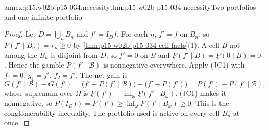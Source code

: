 \begin{annexitem}{annex:p15.w02b-p15-034.necessity}{thm:p15-w02b-p15-034-necessity}{Two portfolios and one infinite portfolio}
\begin{proof}
Let \(D=\bigcup_nB_n\) and \(f'=I_Df\). For each \(n\), \(f'=f\) on
\(B_n\), so \(\underline P(f'\mid B_n)=r_n\geq0\) by
\cref{thm:p15-w02b-p15-034-cell-facts}(1). A cell \(B\) not among the
\(B_n\) is disjoint from \(D\), so \(f'=0\) on \(B\) and
\(\underline P(f'\mid B)=\underline P(0\mid B)=0\). Hence the gamble
\(\underline P(f'\mid\mathcal B)\) is nonnegative everywhere. Apply (JC1)
with \(f_1=0\), \(g_1=f'\), \(f_2=f'\). The net gain is
\[
 G(f'\mid\mathcal B)-G(f')
 =\bigl(f'-\underline P(f'\mid\mathcal B)\bigr)-\bigl(f'-\underline P(f')\bigr)
 =\underline P(f')-\underline P(f'\mid\mathcal B),
\]
whose supremum over \(\Omega\) is
\(\underline P(f')-\inf_\omega\underline P(f'\mid B_\omega)\). (JC1) makes it
nonnegative, so
\(\underline P(I_Df)=\underline P(f')\geq\inf_\omega\underline P(f'\mid B_\omega)\geq0\).
This is the conglomerability inequality. The portfolio used is active on
every cell \(B_n\) at once.
\end{proof}
\end{annexitem}

